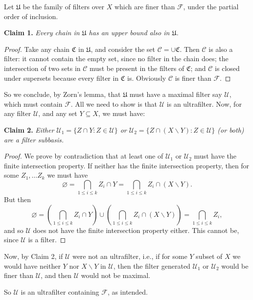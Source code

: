 \documentclass[12pt]{article}
\begin{document}
Let $\mathfrak U$ be the family of filters over $X$ which are finer than $\mathcal F$, under the partial order of inclusion.

\textbf{Claim 1.} \textit{Every chain in $\mathfrak U$ has an upper bound also in $\mathfrak U$.} 
\begin{proof}
Take any chain $\mathfrak C$ in $\mathfrak U$, and consider the set $\mathcal C = \cup \mathfrak C$. Then $\mathcal C$ is also a filter: it cannot contain the empty set, since no filter in the chain does; the intersection of two sets in $\mathcal C$ must be present in the filters of $\mathfrak C$; and $\mathcal C$ is closed under supersets because every 
filter in $\mathfrak C$ is. Obviously $\mathcal C$ is finer than $\mathcal F$.
\end{proof}

So we conclude, by Zorn's lemma, that $\mathfrak U$ must have a maximal filter say $\mathcal U$, which must contain $\mathcal F$. All we need to show is that $\mathcal U$ is an ultrafilter. Now, for any filter $\mathcal U$, and any set $Y \subseteq X$, we must have:

\textbf{Claim 2.} \textit{Either $\mathcal U_1 = \{ Z \cap Y : Z \in \mathcal U \}$ or $\mathcal U_2 = \{ Z \cap (X \backslash Y) : Z \in \mathcal U \}$ (or both) are a filter subbasis.} 
\begin{proof}
We prove by contradiction that at least one of $\mathcal U_1$ or $\mathcal U_2$ must have the finite intersection property. If neither has the finite intersection property, then for some $Z_1, \ldots Z_k$ we must have
\[
\varnothing = \bigcap_{1\le i \le k} Z_i \cap Y = \bigcap_{1\le i \le k} Z_i \cap (X \backslash Y).
\]
But then
\[
\varnothing = \left(\bigcap_{1\le i \le k} Z_i \cap Y\right) \cup \left(\bigcap_{1\le i \le k} Z_i \cap (X \backslash Y)\right) = \bigcap_{1\le i \le k} Z_i,
\]
and so $\mathcal U$ does not have the finite intersection property either. This cannot be, since $\mathcal U$ is a filter.
\end{proof}

Now, by Claim 2, if $\mathcal U$ were not an ultrafilter, i.e., if for some $Y$ subset of $X$ we would have neither $Y$ nor $X \backslash Y$ in $\mathcal U$, then the filter generated $\mathcal U_1$ or $\mathcal U_2$ would be finer than $\mathcal U$, and then $\mathcal U$ would not be maximal.

So $\mathcal U$ is an ultrafilter containing $\mathcal F$, as intended.
\end{document}
